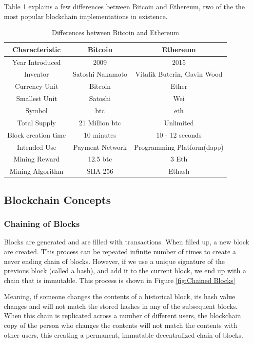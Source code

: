 \documentclass[11pt,openright]{report}
\begin{document}
Table \ref{differences_bitcoin_ethereum} explains a few differences between Bitcoin and Ethereum, two of the the most popular blockchain implementations in existence.
 
\begin{table}[!htbp]
	\renewcommand{\arraystretch}{1.3}
	\caption{Differences between Bitcoin and Ethereum}
	\label{differences_bitcoin_ethereum}
	\centering
	\begin{tabular}{|c||c|c|}
		\hline
		\bfseries Characteristic & \bfseries Bitcoin & \bfseries Ethereum\\
		\hline\hline
	    Year Introduced & 2009 & 2015\\ \hline
	    Inventor & Satoshi Nakamoto & Vitalik Buterin, Gavin Wood\\ \hline
	    Currency Unit & Bitcoin & Ether\\ \hline
	    Smallest Unit & Satoshi & Wei\\ \hline
	    Symbol & btc & eth \\ \hline
	    Total Supply & 21 Million btc & Unlimited\\ \hline
	    Block creation time & 10 minutes & 10 - 12 seconds\\ \hline
	    Intended Use & Payment Network & Programming Platform(dapp)\\ \hline
	    Mining Reward & 12.5 btc & 3 Eth \\ \hline
        Mining Algorithm & SHA-256 & Ethash \\ \hline
	\end{tabular}
\end{table}
\newpage

\subsection{Blockchain Concepts}
\subsubsection{Chaining of Blocks}
Blocks are generated and are filled with transactions. When filled up, a new block are created. This process can be repeated infinite number of times to create a never ending chain of blocks. However, if we use a unique signature of the previous block (called a hash), and add it to the current block, we end up with a chain that is immutable. This process is shown in Figure \ref{fig:Chained Blocks}

Meaning, if someone changes the contents of a historical block, its hash value changes and will not match the stored hashes in any of the subsequent blocks. When this chain is replicated across a number of different users, the blockchain copy of the person who changes the contents will not match the contents with other users, this creating a permanent, immutable decentralized chain of blocks.
\end{document}
